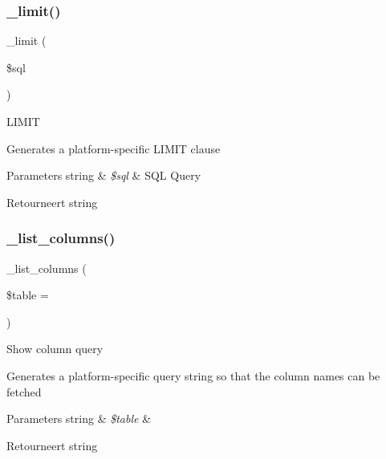 \subsubsection{\texorpdfstring{\_limit()}{\_limit()}}
{\footnotesize\ttfamily \+\_\+limit (\begin{DoxyParamCaption}\item[{}]{\$sql }\end{DoxyParamCaption})\hspace{0.3cm}{\ttfamily [protected]}}

L\+I\+M\+IT

Generates a platform-\/specific L\+I\+M\+IT clause


\begin{DoxyParams}[1]{Parameters}
string & {\em \$sql} & S\+QL Query \\
\hline
\end{DoxyParams}
\begin{DoxyReturn}{Retourneert}
string 
\end{DoxyReturn}
\mbox{\label{class_c_i___d_b__ibase__driver_a7ccb7f9c301fe7f0a9db701254142b63}} 
\subsubsection{\texorpdfstring{\_list\_columns()}{\_list\_columns()}}
{\footnotesize\ttfamily \+\_\+list\+\_\+columns (\begin{DoxyParamCaption}\item[{}]{\$table = {\ttfamily \textquotesingle{}\textquotesingle{}} }\end{DoxyParamCaption})\hspace{0.3cm}{\ttfamily [protected]}}

Show column query

Generates a platform-\/specific query string so that the column names can be fetched


\begin{DoxyParams}[1]{Parameters}
string & {\em \$table} & \\
\hline
\end{DoxyParams}
\begin{DoxyReturn}{Retourneert}
string 
\end{DoxyReturn}
\mbox{\label{class_c_i___d_b__ibase__driver_a435c0f3ce54fe7daa178baa8532ebd54}} 
